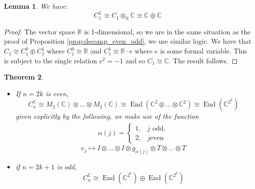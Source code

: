 \documentclass[12pt]{article}
\theoremstyle{plain}
\newtheorem{thm}{Theorem}[subsection] %
\newtheorem{lemma}[thm]{Lemma}
\theoremstyle{definition}
\newcommand{\bb}[1]{\mathbb{#1}}
\begin{document}
	\begin{lemma}\label{lem:case_one}
		We have:
		\begin{equation}
			C_1^{\bb{C}} \cong C_1 \otimes_{\bb{R}}\bb{C} \cong \bb{C} \oplus \bb{C}
		\end{equation}
	\end{lemma}
	\begin{proof}
		The vector space $\bb{R}$ is 1-dimensional, so we are in the same situation as the proof of Proposition \ref{prop:decomp_even_odd}, we use similar logic. We have that $C_1 \cong C_1^0 \oplus C_1^1$ where $C_1^0 \cong \bb{R}$ and $C_1^1 \cong \bb{R}\cdot e$ where $e$ is some formal variable. This is subject to the single relation $e^2 = -1$ and so $C_1 \cong \bb{C}$. The result follows.
	\end{proof}
	\begin{thm}\label{thm:structure_clifford}
		\begin{itemize} There is the following decomposition:
			\item If $n = 2k$ is even,
			\begin{equation}
				C_n^{\bb{C}} \cong M_2(\bb{C}) \otimes \hdots \otimes M_2(\bb{C}) \cong \operatorname{End}(\bb{C}^2 \otimes \hdots \otimes \bb{C}^2) \cong \operatorname{End}(\bb{C}^{2^k})
			\end{equation}
			given explicitly by the following, we make use of the function
			\begin{align*}
				\alpha(j) = \begin{cases}
					1,& j\text{ odd},\\
					2, & j\text{even}
				\end{cases}
			\end{align*}
			\begin{equation}
				e_j \longmapsto I \otimes \hdots \otimes I \otimes g_{\alpha(j)} \otimes T \otimes \hdots \otimes T
			\end{equation}
			\item if $n = 2k+1$ is odd,
			\begin{equation}
				C_n^{\bb{C}} \cong \operatorname{End}(\bb{C}^{2^k}) \oplus \operatorname{End}(\bb{C}^{2^k})
			\end{equation}
		\end{itemize}
	\end{thm}
	
\end{document}
